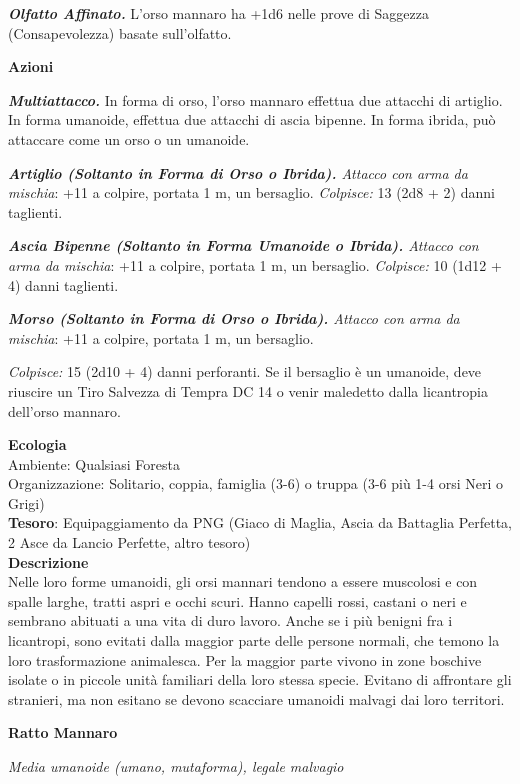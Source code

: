 \begin{multicols}{2}
\textit{\textbf{Olfatto Affinato.}} L'orso mannaro ha +1d6 nelle prove di Saggezza (Consapevolezza) basate sull'olfatto.

\textbf{Azioni}

\textit{\textbf{Multiattacco.}} In forma di orso, l'orso mannaro effettua due attacchi di artiglio. In forma umanoide, effettua due attacchi di ascia bipenne. In forma ibrida, può attaccare come un orso o un umanoide.

\textit{\textbf{Artiglio (Soltanto in Forma di Orso o Ibrida).} Attacco con arma da mischia}: +11 a colpire, portata 1 m, un bersaglio. \textit{Colpisce:} 13 (2d8 + 2) danni taglienti.

\textit{\textbf{Ascia Bipenne (Soltanto in Forma Umanoide o Ibrida).} Attacco con arma da mischia}: +11 a colpire, portata 1 m, un bersaglio. \textit{Colpisce:} 10 (1d12 + 4) danni taglienti.

\textit{\textbf{Morso (Soltanto in Forma di Orso o Ibrida).} Attacco con arma da mischia}: +11 a colpire, portata 1 m, un bersaglio.

\textit{Colpisce:} 15 (2d10 + 4) danni perforanti. Se il bersaglio è un umanoide, deve riuscire un Tiro Salvezza di Tempra DC 14 o venir maledetto dalla licantropia dell'orso mannaro.


\textbf{Ecologia}\\
Ambiente: Qualsiasi Foresta\\
Organizzazione: Solitario, coppia, famiglia (3-6) o truppa (3-6 più 1-4 orsi Neri o Grigi)\\
\textbf{Tesoro}: Equipaggiamento da PNG (Giaco di Maglia, Ascia da Battaglia Perfetta, 2 Asce da Lancio Perfette, altro tesoro)\\
\textbf{Descrizione}\\
Nelle loro forme umanoidi, gli orsi mannari tendono a essere muscolosi e con spalle larghe, tratti aspri e occhi scuri. Hanno capelli rossi, castani o neri e sembrano abituati a una vita di duro lavoro. Anche se i più benigni fra i licantropi, sono evitati dalla maggior parte delle persone normali, che temono la loro trasformazione animalesca. Per la maggior parte vivono in zone boschive isolate o in piccole unità familiari della loro stessa specie. Evitano di affrontare gli stranieri, ma non esitano se devono scacciare umanoidi malvagi dai loro territori.

\medskip{}\textbf{Ratto Mannaro}

\textit{Media umanoide (umano, mutaforma), legale malvagio}


\end{multicols}
